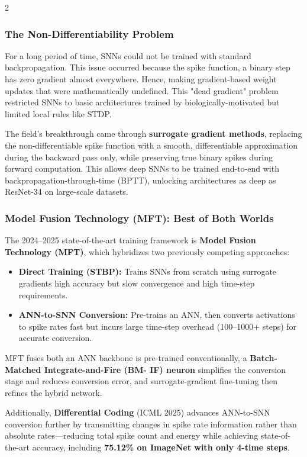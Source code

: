 \begin{multicols}{2}
  \subsubsection*{The Non-Differentiability Problem}
  For a long period of time, SNNs could not be trained with standard backpropagation. This issue occurred
  because the spike function, a binary step has zero gradient almost everywhere. Hence, making gradient-based
  weight updates that were mathematically undefined. This "dead gradient" problem restricted SNNs to basic
  architectures trained by biologically-motivated but limited local rules like STDP.

  \noindent
  The field's breakthrough came through \textbf{surrogate gradient methods}, replacing the non-differentiable spike
  function with a smooth, differentiable approximation during the backward pass only, while preserving true
  binary spikes during forward computation. This allows deep SNNs to be trained end-to-end with
  backpropagation-through-time (BPTT), unlocking architectures as deep as ResNet-34 on large-scale datasets.

  \subsubsection*{Model Fusion Technology (MFT): Best of Both Worlds}
  The 2024--2025 state-of-the-art training framework is \textbf{Model Fusion Technology (MFT)}, which hybridizes two previously competing approaches:
  \begin{itemize}
    \item \textbf{Direct Training (STBP):} Trains SNNs from scratch using surrogate gradients high accuracy but slow convergence and high time-step requirements.
    \item \textbf{ANN-to-SNN Conversion:} Pre-trains an ANN, then converts activations to spike rates fast but incurs large time-step overhead (100--1000+ steps) for accurate conversion.
  \end{itemize}
  MFT fuses both an ANN backbone is pre-trained conventionally, a \textbf{Batch-Matched Integrate-and-Fire (BM-
  IF) neuron} simplifies the conversion stage and reduces conversion error, and surrogate-gradient fine-tuning
  then refines the hybrid network.

  Additionally, \textbf{Differential Coding} (ICML 2025) advances ANN-to-SNN conversion further by
  transmitting changes in spike rate information rather than absolute rates---reducing total spike count and
  energy while achieving state-of-the-art accuracy, including \textbf{75.12\% on ImageNet with only 4-time steps}.


\end{multicols}
